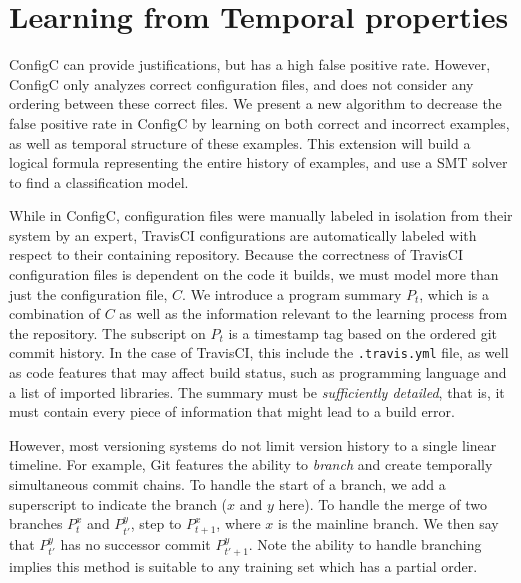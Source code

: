 \section{Learning from Temporal properties}


ConfigC can provide justifications, but has a high false positive rate.
However, ConfigC only analyzes correct configuration files, and does not consider any ordering between these correct files.
We present a new algorithm to decrease the false positive rate in ConfigC by learning on both correct and incorrect examples, as well as temporal structure of these examples.
This extension will build a logical formula representing the entire history of examples, and use a SMT solver to find a classification model.

While in ConfigC, configuration files were manually labeled in isolation from their system by an expert, TravisCI configurations are automatically labeled with respect to their containing repository.
Because the correctness of TravisCI configuration files is dependent on the code it builds, we must model more than just the configuration file, $C$. 
We introduce a program summary $P_t$, which is a combination of $C$ as well as the information relevant to the learning process from the repository.
The subscript on $P_t$ is a timestamp tag based on the ordered git commit history.
In the case of TravisCI, this include the \verb|.travis.yml| file, as well as code features that may affect build status, such as programming language and a list of imported libraries.
The summary must be \textit{sufficiently detailed}, that is, it must contain every piece of information that might lead to a build error.

However, most versioning systems do not limit version history to a single linear timeline.
For example, Git features the ability to \textit{branch} and create temporally simultaneous commit chains.
To handle the start of a branch, we add a superscript to indicate the branch ($x$ and $y$ here).
To handle the merge of two branches $P_{t}^{x}$ and $P_{t'}^{y}$, step to $P_{t+1}^{x}$, where $x$ is the mainline branch.
We then say that $P_{t'}^{y}$ has no successor commit $P_{t'+1}^{y}$.
Note the ability to handle branching implies this method is suitable to any training set which has a partial order.

